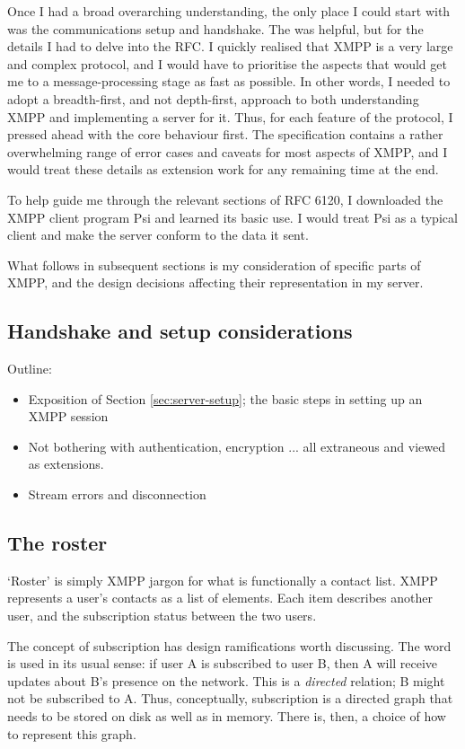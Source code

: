 \documentclass[12pt,a4paper,twoside,openright]{report}
\begin{document}
{Once I had a broad overarching understanding, the only place I could start with was the communications setup and handshake. The  was helpful, but for the details I had to delve into the RFC. I quickly realised that XMPP is a very large and complex protocol, and I would have to prioritise the aspects that would get me to a message-processing stage as fast as possible. In other words, I needed to adopt a breadth-first, and not depth-first, approach to both understanding XMPP and implementing a server for it. Thus, for each feature of the protocol, I pressed ahead with the core behaviour first. The specification contains a rather overwhelming range of error cases and caveats for most aspects of XMPP, and I would treat these details as extension work for any remaining time at the end.

To help guide me through the relevant sections of RFC 6120, I downloaded the XMPP client program Psi\cite{Psi-IM} and learned its basic use. I would treat Psi as a typical client and make the server conform to the data it sent.

What follows in subsequent sections is my consideration of specific parts of XMPP, and the design decisions affecting their representation in my server.

\subsection{Handshake and setup considerations}
Outline:
\begin{itemize}
  \item Exposition of Section \ref{sec:server-setup}; the basic steps in setting up an XMPP session
  \item Not bothering with authentication, encryption ... all extraneous and viewed as extensions.
  \item Stream errors and disconnection
\end{itemize}

\subsection{The roster}
`Roster' is simply XMPP jargon for what is functionally a contact list. XMPP represents a user's contacts as a list of  elements. Each item describes another user, and the subscription status between the two users.

The concept of subscription has design ramifications worth discussing. The word is used in its usual sense: if user A is subscribed to user B, then A will receive updates about B's presence on the network. This is a \emph{directed} relation; B might not be subscribed to A. Thus, conceptually, subscription is a directed graph that needs to be stored on disk as well as in memory. There is, then, a choice of how to represent this graph.

}
\end{document}
